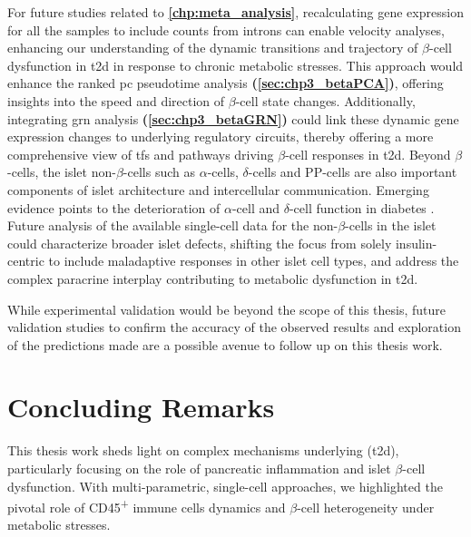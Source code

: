 \par For future studies related to \textbf{\autoref{chp:meta_analysis}}, recalculating gene expression for all the samples to include counts from introns can enable  velocity analyses, enhancing our understanding of the dynamic transitions and trajectory of $\beta$-cell dysfunction in \gls{t2d} in response to chronic metabolic stresses. This approach would enhance the ranked \gls{pc} pseudotime analysis \textbf{(\autoref{sec:chp3_betaPCA})}, offering insights into the speed and direction of $\beta$-cell state changes. Additionally, integrating \gls{grn} analysis \textbf{(\autoref{sec:chp3_betaGRN})} could link these dynamic gene expression changes to underlying regulatory circuits, thereby offering a more comprehensive view of \glspl{tf} and pathways driving $\beta$-cell responses in \gls{t2d}. Beyond $\beta$-cells, the islet non-$\beta$-cells such as $\alpha$-cells, $\delta$-cells and PP-cells are also important components of islet architecture and intercellular communication. Emerging evidence points to the deterioration of $\alpha$-cell and $\delta$-cell function in diabetes \textbf{\cite{brereton_alpha-_2015,gao_-cells_2021,brooks_not_2023}}. Future analysis of the available single-cell data for the non-$\beta$-cells in the islet could characterize broader islet defects, shifting the focus from solely insulin-centric to include maladaptive responses in other islet cell types, and address the complex paracrine interplay contributing to metabolic dysfunction in \gls{t2d}.\\

\par While experimental validation would be beyond the scope of this thesis, future validation studies to confirm the accuracy of the observed results and exploration of the predictions made are a possible avenue to follow up on this thesis work.

\clearpage

\section{Concluding Remarks}
\vspace{-5pt}
\par This thesis work sheds light on complex mechanisms underlying  (\gls{t2d}), particularly focusing on the role of pancreatic inflammation and islet $\beta$-cell dysfunction. With multi-parametric, single-cell approaches, we highlighted the pivotal role of CD45\textsuperscript{+} immune cells dynamics and $\beta$-cell heterogeneity under metabolic stresses.\\

